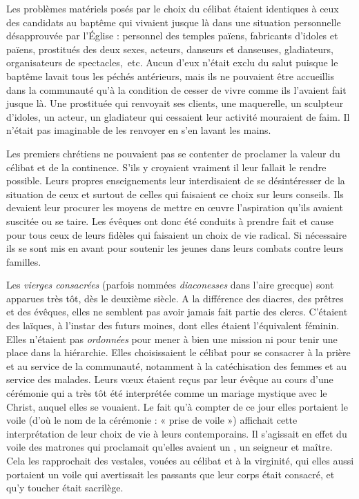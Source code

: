  Les problèmes matériels posés par le choix du célibat étaient identiques à ceux des candidats au baptême qui vivaient jusque là dans une situation personnelle désapprouvée par l'Église : personnel des temples païens, fabricants d'idoles et  païens, prostitués des deux sexes, acteurs, danseurs et danseuses, gladiateurs, organisateurs de spectacles,~etc. Aucun d'eux n'était exclu du salut puisque le baptême lavait tous les péchés antérieurs, mais ils ne pouvaient être accueillis dans la communauté qu'à la condition de cesser de vivre comme ils l'avaient fait jusque là. Une prostituée qui renvoyait ses clients, une maquerelle, un sculpteur d'idoles, un acteur, un gladiateur qui cessaient leur activité mouraient de faim. Il n'était pas imaginable de les renvoyer en s'en lavant les mains. 

 Les premiers chrétiens ne pouvaient pas se contenter de proclamer la valeur du célibat et de la continence. S'ils y croyaient vraiment il leur fallait le rendre possible. Leurs propres enseignements leur interdisaient de se désintéresser de la situation de ceux et surtout de celles qui faisaient ce choix sur leurs conseils. Ils devaient leur procurer les moyens de mettre en œuvre l'aspiration qu'ils avaient suscitée ou se taire. Les évêques ont donc été conduits à prendre fait et cause pour tous ceux de leurs fidèles qui faisaient un choix de vie radical. Si nécessaire ils se sont mis en avant pour soutenir les jeunes dans leurs combats contre leurs familles. 

 Les \emph{vierges consacrées} (parfois nommées \emph{diaconesses} dans l'aire grecque) sont apparues très tôt, dès le deuxième siècle. A la différence des diacres, des prêtres et des évêques, elles ne semblent pas avoir jamais fait partie des clercs. C'étaient des laïques, à l'instar des futurs moines, dont elles étaient l'équivalent féminin. Elles n'étaient pas \emph{ordonnées} pour mener à bien une mission ni pour tenir une place dans la hiérarchie. Elles choisissaient le célibat pour se consacrer à la prière et au service de la communauté, notamment à la catéchisation des femmes et au service des malades. Leurs vœux étaient reçus par leur évêque au cours d'une cérémonie qui a très tôt été interprétée comme un mariage mystique avec le Christ, auquel elles se vouaient. Le fait qu'à compter de ce jour elles portaient le voile (d'où le nom de la cérémonie : « prise de voile ») affichait cette interprétation de leur choix de vie à leurs contemporains. Il s'agissait en effet du voile des matrones qui proclamait qu'elles avaient un , un seigneur et maître. Cela les rapprochait des vestales, vouées au célibat et à la virginité, qui elles aussi portaient un voile qui avertissait les passants que leur corps était consacré, et qu'y toucher était sacrilège.


